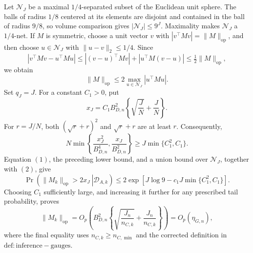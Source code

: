 Let \(\mathcal N_J\) be a maximal \(1/4\)-separated subset of the Euclidean unit sphere.  The balls of radius \(1/8\) centered at its elements are disjoint and contained in the ball of radius \(9/8\), so volume comparison gives \(|\mathcal N_J|\le 9^J\).  Maximality makes \(\mathcal N_J\) a \(1/4\)-net.  If \(M\) is symmetric, choose a unit vector \(v\) with \(|v^\top Mv|=\|M\|_{\mathrm{op}}\), and then choose \(u\in\mathcal N_J\) with \(\|u-v\|_2\le1/4\).  Since
\[
 |v^\top Mv-u^\top Mu|
 \le |(v-u)^\top Mv|+|u^\top M(v-u)|
 \le \tfrac12\|M\|_{\mathrm{op}},
\]
we obtain
\[
 \|M\|_{\mathrm{op}}\le2\max_{u\in\mathcal N_J}|u^\top Mu|. \tag{2}
\]
Set \(q_J=J\).  For a constant \(C_1>0\), put
\[
 x_J=C_1B_{D,n}^2\left\{\sqrt{\frac{J}{N}}+\frac{J}{N}\right\}.
\]
For \(r=J/N\), both \((\sqrt r+r)^2\) and \(\sqrt r+r\) are at least \(r\).  Consequently,
\[
 N\min\!\left\{\frac{x_J^2}{B_{D,n}^4},
 \frac{x_J}{B_{D,n}^2}\right\}
 \ge J\min\{C_1^2,C_1\}.
\]
Equation \((1)\), the preceding lower bound, and a union bound over \(\mathcal N_J\), together with \((2)\), give
\[
 \Pr\!\left(\left.\|M_k\|_{\mathrm{op}}>2x_J\ \right|\mathcal D_{A,k}\right)
 \le 2\exp\!\left[J\log 9-c_1J\min\{C_1^2,C_1\}\right].
\]
Choosing \(C_1\) sufficiently large, and increasing it further for any prescribed tail probability, proves
\[
 \|M_k\|_{\mathrm{op}}
 =O_p\!\left(B_{D,n}^2\left\{\sqrt{\frac{J_n}{n_{C,k}}}
 +\frac{J_n}{n_{C,k}}\right\}\right)
 =O_p(\eta_{G,n}), \tag{3}
\]
where the final equality uses \(n_{C,k}\ge n_{C,\min}\) and the corrected definition in \(\mathrm{def:inference-gauges}\).

